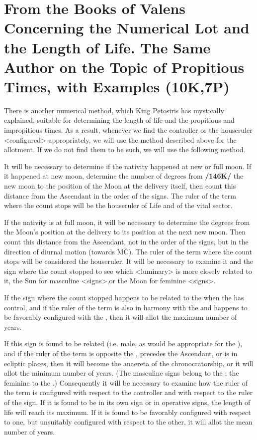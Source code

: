\section{From the Books of Valens Concerning the Numerical Lot and the Length of Life. The Same Author on the Topic of Propitious Times, with Examples (10K,7P)}

There is another numerical method, which  King Petosiris has mystically explained, suitable for determining the length of life and the propitious and impropitious times. As a result, whenever we find the controller or the houseruler <configured> appropriately, we will use the method described above for the allotment. If we do not find them to be such, we will use the following method.

It will be necessary to determine if the nativity happened at new or full moon. If it happened at new moon, determine the number of degrees from \textbf{/146K/} the new moon to the position of the Moon at the delivery itself, then count this distance from the Ascendant in the order of the signs. The ruler of the term where the count stops will be the houseruler of Life and of the vital sector. 

If the nativity is at full moon, it will be necessary to determine the degrees from the Moon’s position at the delivery to its position at the next new moon. Then count this distance from the Ascendant, not in the order of the signs, but in the
direction of diurnal motion (towards MC). The ruler of the term where the count stops will be considered the houseruler. It will be necessary to examine it and the sign where the count stopped to see which <luminary> is more closely related to it, the Sun for masculine <signs>,or the Moon for feminine <signs>.

If the sign where the count stopped happens to be related to the \Sun\xspace when the \Sun\xspace has control, and if the
ruler of the term is also in harmony with the \Sun\xspace and happens to be favorably configured with the \Sun, then
it will allot the maximum number of years. 

If this sign is found to be related (i.e. male, as would be appropriate for the \Sun), and if the ruler of the term is opposite the \Sun, precedes the Ascendant, or is in ecliptic places, then it will become the anaereta of the chronocratorship, or it will allot the minimum number of years. (The masculine signs belong to the \Sun; the feminine to the \Moon.) Consequently it will be necessary to examine how the ruler of the term is configured with respect to the controller and with respect to the ruler of the sign. If it is found to be in its own sign or in operative signs, the length of life will reach its maximum. If it is found to be favorably configured with respect to one, but unsuitably configured with respect to the other, it will allot the mean number of years. 

